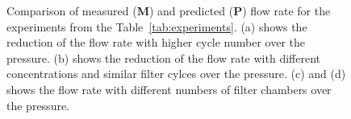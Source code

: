 \begin{figure}[h!]
{
}
\caption{Comparison of measured (\textbf{M}) and predicted (\textbf{P}) flow rate for the experiments from the Table~\ref{tab:experiments}. (a) shows the reduction of the flow rate with higher cycle number over the pressure. (b) shows the reduction of the flow rate with different concentrations and similar filter cylces over the pressure. (c) and (d) shows the flow rate with different numbers of filter chambers over the pressure.}
\label{fig:flow_comparison}
\end{figure}
\newpage
